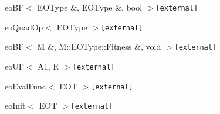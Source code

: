 \begin{CompactList}
\begin{CompactList}
\begin{CompactList}
\begin{CompactList}
\end{CompactList}
\end{CompactList}
\item eo\-BF$<$ EOType \&, EOType \&, bool $>${\tt  [external]}\begin{CompactList}
\item eo\-Quad\-Op$<$ EOType $>${\tt  [external]}\begin{CompactList}
\item {}
\item {}
\item {}
\end{CompactList}
\end{CompactList}
\item eo\-BF$<$ M \&, M::EOType::Fitness \&, void $>${\tt  [external]}\begin{CompactList}
\item {}
\begin{CompactList}
\item {}
\item {}
\item {}
\end{CompactList}
\end{CompactList}
\item eo\-UF$<$ A1, R $>${\tt  [external]}\begin{CompactList}
\item eo\-Eval\-Func$<$ EOT $>${\tt  [external]}\begin{CompactList}
\item {}
\item {}
\end{CompactList}
\item eo\-Init$<$ EOT $>${\tt  [external]}\begin{CompactList}
\item {}

\end{CompactList}
\end{CompactList}
\end{CompactList}
\end{CompactList}
